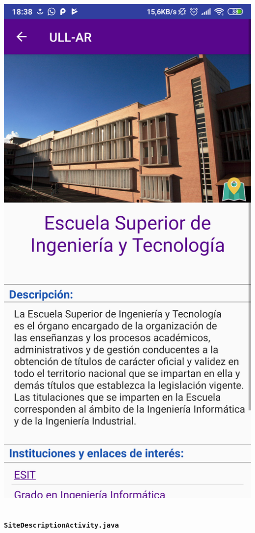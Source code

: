\begin{frame}
\begin{columns}
\begin{column}{0.4\textwidth}
\begin{center}
				\includegraphics[width=0.75\linewidth]{Images/siteInfoApp}
			\end{center}
		\end{column}
	\end{columns}
\end{frame} 
  
\begin{frame}
	\frametitle{\texttt{SiteDescriptionActivity.java}}
	
\end{frame}  


